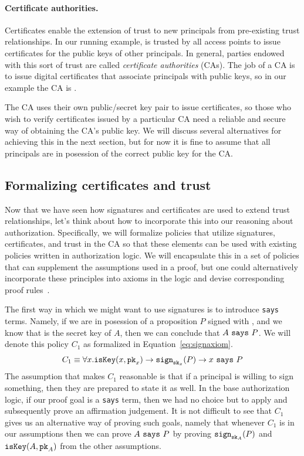 \documentclass[11pt,twoside]{scrartcl}
\begin{document}
\paragraph{Certificate authorities.}
Certificates enable the extension of trust to new principals from pre-existing trust relationships. In our running example, \eduroam is trusted by all access points to issue certificates for the public keys of other principals. In general, parties endowed with this sort of trust are called \emph{certificate authorities} (CAs). The job of a CA is to issue digital certificates that associate principals with public keys, so in our example the CA is \eduroam.

The CA uses their own public/secret key pair to issue certificates, so those who wish to verify certificates issued by a particular CA need a reliable and secure way of obtaining the CA's public key. We will discuss several alternatives for achieving this in the next section, but for now it is fine to assume that all principals are in posession of the correct public key for the CA.

\subsection{Formalizing certificates and trust}

Now that we have seen how signatures and certificates are used to extend trust relationships, let's think about how to incorporate this into our reasoning about authorization. Specifically, we will formalize policies that utilize signatures, certificates, and trust in the CA so that these elements can be used with existing policies written in authorization logic. We will encapsulate this in a set of policies that can supplement the assumptions used in a proof, but one could alternatively incorporate these principles into axioms in the logic and devise corresponding proof rules~\cite{bauer:thesis}.

The first way in which we might want to use signatures is to introduce \verb'says' terms. Namely, if we are in posession of a proposition $P$ signed with , and we know that  is the secret key of $A$, then we can conclude that $A~\texttt{\upshape says}~P$. We will denote this policy $C_1$ as formalized in Equation~\ref{eq:signaxiom}.
\begin{equation}
\label{eq:signaxiom}
C_1 \equiv \forall x . \iskey{x}{\pk{x}} \limply \sign{\sk{x}}{\ausfml} \limply \says{x}{\ausfml}
\end{equation}
The assumption that makes $C_1$ reasonable is that if a principal is willing to sign something, then they are prepared to state it as well. In the base authorization logic, if our proof goal is a \verb'says' term, then we had no choice but to apply  and subsequently prove an affirmation judgement. It is not difficult to see that $C_1$ gives us an alternative way of proving such goals, namely that whenever $C_1$ is in our assumptions then we can prove $A~\texttt{\upshape says}~P$ by proving $\texttt{\upshape sign}_{\texttt{\upshape sk}_{A}}(P)$ and $\texttt{\upshape isKey}(A,\texttt{\upshape pk}_{A})$ from the other assumptions.
\end{document}
